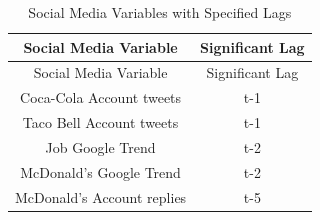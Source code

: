 \documentclass[12pt,oneside]{chicagocapstone}
\begin{document}
\begin{longtable}[]{@{}cc@{}}
\caption{\label{tab:inher} Social Media Variables with Specified Lags}\tabularnewline
\toprule
\begin{minipage}[b]{0.44\columnwidth}\centering
Social Media Variable\strut
\end{minipage} & \begin{minipage}[b]{0.39\columnwidth}\centering
Significant Lag\strut
\end{minipage}\tabularnewline
\midrule
\endfirsthead
\toprule
\begin{minipage}[b]{0.44\columnwidth}\centering
Social Media Variable\strut
\end{minipage} & \begin{minipage}[b]{0.39\columnwidth}\centering
Significant Lag\strut
\end{minipage}\tabularnewline
\midrule
\endhead
\begin{minipage}[t]{0.44\columnwidth}\centering
Coca-Cola Account tweets\strut
\end{minipage} & \begin{minipage}[t]{0.39\columnwidth}\centering
t-1\strut
\end{minipage}\tabularnewline
\begin{minipage}[t]{0.44\columnwidth}\centering
Taco Bell Account tweets\strut
\end{minipage} & \begin{minipage}[t]{0.39\columnwidth}\centering
t-1\strut
\end{minipage}\tabularnewline
\begin{minipage}[t]{0.44\columnwidth}\centering
Job Google Trend\strut
\end{minipage} & \begin{minipage}[t]{0.39\columnwidth}\centering
t-2\strut
\end{minipage}\tabularnewline
\begin{minipage}[t]{0.44\columnwidth}\centering
McDonald's Google Trend\strut
\end{minipage} & \begin{minipage}[t]{0.39\columnwidth}\centering
t-2\strut
\end{minipage}\tabularnewline
\begin{minipage}[t]{0.44\columnwidth}\centering
McDonald's Account replies\strut
\end{minipage} & \begin{minipage}[t]{0.39\columnwidth}\centering
t-5\strut
\end{minipage}\tabularnewline

\end{longtable}
\end{document}
